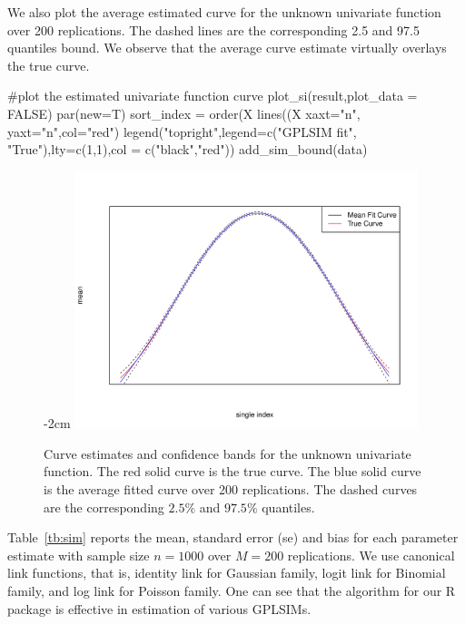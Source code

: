 We also plot the average estimated curve for the unknown univariate function over 200 replications. The dashed lines are the corresponding 2.5 and 97.5 quantiles bound. We observe that the average curve estimate virtually overlays the true curve. 

\begin{Schunk}
  \begin{Sinput}
  #plot the estimated univariate function curve
  plot_si(result,plot_data = FALSE)
  par(new=T)
  sort_index = order(X%
  lines((X%
  xaxt="n", yaxt="n",col="red")
  legend("topright",legend=c("GPLSIM fit", "True"),lty=c(1,1),col = c("black","red"))
  add_sim_bound(data)
  \end{Sinput}
  \begin{figure}[ht]
    \centering
    \addtolength{\leftskip} {-2cm}
    \addtolength{\rightskip}{-2cm}
    \includegraphics[width=10cm]{gplsim_files/figure-latex/unnamed-chunk-9-1}   
    \caption{
    Curve estimates and confidence bands for the unknown univariate function. The red
    solid curve is the true curve. The blue solid curve is
    the average fitted curve over 200 replications. The
    dashed curves are the corresponding $2.5\%$ and $97.5\%$
    quantiles.}
  \end{figure}
\end{Schunk}

Table~\ref{tb:sim} reports the mean, standard error (se) and bias for each parameter estimate with sample size $n=1000$ over $M=200$ replications. We use canonical link functions, that is, identity link for Gaussian family, logit link for Binomial family, and log link for Poisson family. One can see that the algorithm for our R package  is effective in estimation of various GPLSIMs. 


